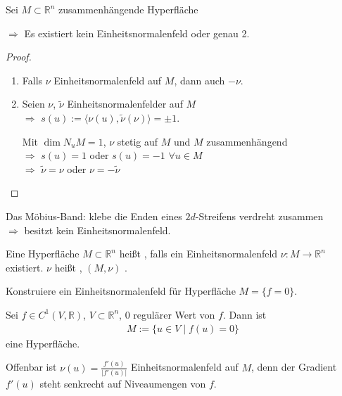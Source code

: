 \begin{lemma}
	Sei $M\subset\mathbb{R}^n$ zusammenhängende Hyperfläche
	
	\hspace{0.5em}$\Rightarrow$ Es existiert kein Einheitsnormalenfeld oder genau 2.
\end{lemma}

\begin{proof}\hspace*{0pt}
	\vspace*{-0.8\baselineskip}
	\begin{enumerate}[label={\alph*)}]
		\item Falls $\nu$ Einheitsnormalenfeld auf $M$, dann auch $-\nu$.
		\item Seien $\nu$, $\tilde{\nu}$ Einheitsnormalenfelder auf $M$ \\
		\hspace*{0.5em}$\Rightarrow$ $s(u) := \langle \nu(u), \tilde{\nu}(\nu)\rangle = \pm 1$.
		
		Mit $\dim N_u M = 1$, $\nu$ stetig auf $M$ und $M$ zusammenhängend \\
		\hspace*{0.5em}$\Rightarrow$ $s(u) = 1$ oder $s(u) = -1$ $\forall u\in M$ \\
		\hspace*{0.5em}$\Rightarrow$ $\tilde{\nu} = \nu$ oder $\nu = -\tilde{\nu}$
	\end{enumerate}
\end{proof}

\begin{example}
	Das Möbius-Band: klebe die Enden eines $2d$-Streifens verdreht zusammen \\
	\hspace*{0.5em}$\Rightarrow$ besitzt kein Einheitsnormalenfeld.
\end{example}

\begin{*definition}
	Eine Hyperfläche $M\subset\mathbb{R}^n$ heißt , falls ein Einheitsnormalenfeld $\nu\colon M\to\mathbb{R}^n$ existiert. $\nu$ heißt , $(M,\nu)$ .
\end{*definition}

\begin{example}
	Konstruiere ein Einheitsnormalenfeld für Hyperfläche $M = \{ f = 0\}$.
	
	Sei $f\in C^1(V,\mathbb{R})$, $V\subset\mathbb{R}^n$, $0$ regulärer Wert von $f$. Dann ist \begin{align*}
		M := \{ u\in V \mid f(u) = 0 \}
	\end{align*}
	eine Hyperfläche.
	
	Offenbar ist $\nu(u) = \frac{f'(u)}{\vert f'(u)\vert}$ Einheitsnormalenfeld auf $M$, denn der Gradient $f'(u)$ steht senkrecht auf Niveaumengen von $f$.
\end{example}

